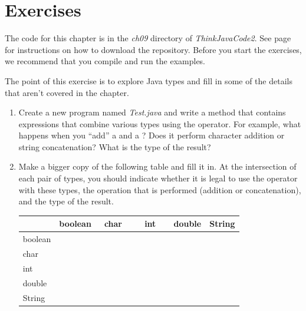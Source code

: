 \section{Exercises}

The code for this chapter is in the {\it ch09} directory of {\it ThinkJavaCode2}.
See page~\pageref{code} for instructions on how to download the repository.
Before you start the exercises, we recommend that you compile and run the examples.


\begin{exercise}  %

The point of this exercise is to explore Java types and fill in some of the details that aren't covered in the chapter.


\begin{enumerate}

\item Create a new program named {\it Test.java} and write a  method that contains expressions that combine various types using the \java{+} operator.
For example, what happens when you ``add'' a  and a ?
Does it perform character addition or string concatenation?
What is the type of the result?

\item Make a bigger copy of the following table and fill it in.
At the intersection of each pair of types, you should indicate whether it is legal to use the \java{+} operator with these types, the operation that is performed (addition or concatenation), and the type of the result.

\begin{center}
\begin{tabular}{|l|l|l|l|l|l|} \hline
        &  boolean  &  ~char~  &  ~~int~~  &  double  &  String \\ \hline
boolean &           &          &           &          &         \\ \hline
char    &           &          &           &          &         \\ \hline
int     &           &          &           &          &         \\ \hline
double  &           &          &           &          &         \\ \hline
String  &           &          &           &          &         \\ \hline
\end{tabular}
\end{center}


\end{enumerate}
\end{exercise}
